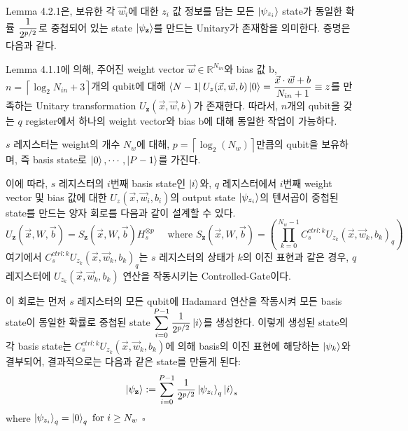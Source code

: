 \begin{lemma}
\end{lemma}

Lemma 4.2.1은, 보유한 각 \(\vec{w}_i\)에 대한 \(\displaystyle {z}_i\) 값 정보를 담는 모든 \(\ket{\psi_{z_i}}\) state가 동일한 확률 \(\displaystyle {1 \over {2^{p/2}}}\)로 중첩되어 있는 state \(\ket{\psi_{\mathbf z}}\)를 만드는 Unitary가 존재함을 의미한다. 증명은 다음과 같다.

\begin{pf}
    Lemma 4.1.1에 의해, 주어진 weight vector $\vec{w} \in \mathbb{R}^{N_{in}}$와 bias 값 b, \(n = \left\lceil \log_2{N_{in}} + 3 \right\rceil\)개의 qubit에 대해 \(\displaystyle \bra{N-1}U_z(\vec{x},\vec{w},b)\ket{0} = \frac{\vec{x}\cdot \vec{w}+b}{N_{in}+1} \equiv z\)를 만족하는 Unitary transformation \(U_{\mathbf z}(\vec{x},\vec{w},b)\)가 존재한다. 따라서, $n$개의 qubit을 갖는 $q$ register에서 하나의 weight vector와 bias b에 대해 동일한 작업이 가능하다.

    $s$ 레지스터는 weight의 개수 \(N_w\)에 대해, \(p = \left\lceil \log_2(N_w) \right\rceil\)만큼의 qubit을 보유하며, 즉 basis state로 \(\ket{0}, \cdots, \ket{P-1}\)를 가진다.

    이에 따라, \(s\) 레지스터의 \(i\)번째 basis state인 \(\ket{i}\)와, \(q\) 레지스터에서 \(i\)번째 weight vector 및 bias 값에 대한 \(U_z(\vec{x}, \vec{w}_i, b_i)\)의 output state \(\ket{\psi_{z_i}}\)의 텐서곱이 중첩된 state를 만드는 양자 회로를 다음과 같이 설계할 수 있다.
    \[
        U_{\mathbf z}(\vec{x}, W, \vec{b}) = S_{\mathbf z}(\vec{x}, W, \vec{b}) H_s^{\otimes p} \quad \text{ where } S_{\mathbf z}(\vec{x}, W, \vec{b})= \left(\prod_{k=0}^{N_w-1}C_{s}^{ctrl : k}U_{z_k}(\vec{x}, \vec{w}_k, b_k)_q\right)
    \]
    여기에서 \(C_{s}^{ctrl:k}U_{z_k}(\vec{x}, \vec{w}_k, b_k)_q\)는 \(s\) 레지스터의 상태가 \(k\)의 이진 표현과 같은 경우, \(q\) 레지스터에 \(U_{z_k}(\vec{x}, \vec{w}_k, b_k)\) 연산을 작동시키는 Controlled-Gate이다.

    이 회로는 먼저 \(s\) 레지스터의 모든 qubit에 Hadamard 연산을 작동시켜 모든 basis state이 동일한 확률로 중첩된 state \(\displaystyle \sum_{i=0}^{P-1} {1\over {2^{p/2}}}\ket{i}\)를 생성한다. 이렇게 생성된 state의 각 basis state는 \(C_{s}^{ctrl:k}U_{z_k}(\vec{x}, \vec{w}_k, b_k)\)에 의해 basis의 이진 표현에 해당하는 $\ket{\psi_k}$와 결부되어, 결과적으로는 다음과 같은 state를 만들게 된다:
    \[
        \ket{\psi_{\mathbf{z}}} := \sum_{i=0}^{P-1} {1\over {2^{p/2}}} \ket{\psi_{z_i}}_q \ket{i}_s
    \]
    where \(\ket{\psi_{z_i}}_q = \ket{0}_q \text{ for } i \ge N_w\) \quad $\square$
\end{pf}

